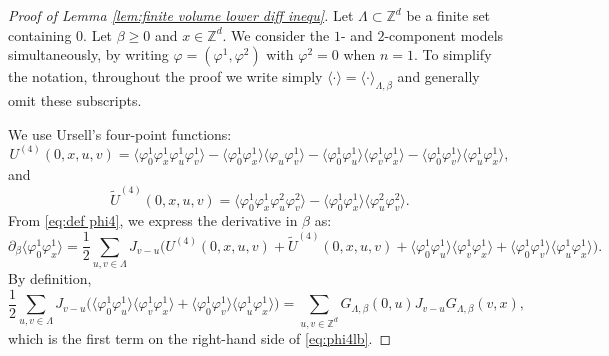 \documentclass[11pt,a4paper]{article}
\numberwithin{equation}{section}
\theoremstyle{plain}
\theoremstyle{definition}
\newcommand\1{\mathds{1}}
\begin{document}
\begin{proof}[Proof of Lemma \textup{\ref{lem:finite volume lower diff inequ}}]
Let $\Lambda\subset \mathbb Z^d$ be a finite set containing $0$. Let $\beta\geq 0$ and $x\in \mathbb Z^d$. We consider the $1$- and $2$-component models simultaneously, by writing
$\varphi=(\varphi^1,\varphi^2)$ with  $\varphi^2=0$ when $n=1$.
To simplify the notation, throughout the proof we write simply $\langle \cdot\rangle=\langle\cdot\rangle_{\Lambda,\beta}$ and generally omit these subscripts.

We use Ursell's four-point functions:
\begin{equation}
     U^{(4)}(0,x,u,v) = \langle \varphi_0^1 \varphi_x^1 \varphi_u^1 \varphi_v^1 \rangle - \langle \varphi_0^1 \varphi_x^1 \rangle \langle \varphi_u \varphi_v^1\rangle-\langle \varphi_0^1 \varphi_u^1 \rangle \langle \varphi_v^1 \varphi_x^1 \rangle  - \langle \varphi_0^1 \varphi_v^1 \rangle \langle \varphi_u^1 \varphi_x^1 \rangle,
\end{equation}
and
\begin{equation}
	\tilde{U}^{(4)}(0,x,u,v)=\langle \varphi_0^1\varphi_x^1\varphi_u^2\varphi_v^2\rangle-\langle \varphi_0^1\varphi_x^1\rangle\langle \varphi_u^2\varphi_v^2\rangle.
\end{equation}
From \eqref{eq:def phi4}, we express the derivative in $\beta$ as:
\begin{equation}
		\partial_\beta\langle \varphi_0^1\varphi_x^1\rangle  			
=
\frac 12 \sum_{u,v\in \Lambda}
J_{v-u} \Big( U^{(4)}(0,x,u,v)+\tilde{U}^{(4)}(0,x,u,v)+\langle \varphi_0^1 \varphi_u^1 \rangle \langle \varphi_v^1 \varphi_x^1 \rangle  + \langle \varphi_0^1 \varphi_v^1 \rangle \langle \varphi_u^1 \varphi_x^1 \rangle \Big)\label{eq:phi4lb0}.
\end{equation}
By definition,
\begin{equation}\label{eq:phi4lb1}
\frac 12 \sum_{u,v\in \Lambda}
J_{v-u}\Big(\langle \varphi_0^1 \varphi_u^1 \rangle \langle \varphi_v^1 \varphi_x^1 \rangle  + \langle \varphi_0^1 \varphi_v^1 \rangle \langle \varphi_u^1 \varphi_x^1 \rangle\Big)=\sum_{u,v\in \mathbb Z^d}G_{\Lambda,\beta}(0,u)J_{v-u}G_{\Lambda,\beta}(v,x),
\end{equation}
which is the first term on the right-hand side of \eqref{eq:phi4lb}.


\end{proof}
\end{document}
